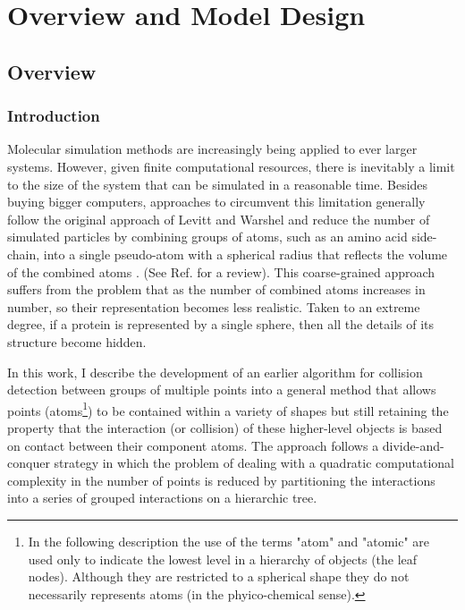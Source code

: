 \documentclass[review]{elsarticle}
\begin{document}
\clearpage
\section{Overview and Model Design}

\subsection{Overview}

\subsubsection{Introduction}

Molecular simulation methods are increasingly being applied to ever larger systems.
However, given finite computational resources, there is inevitably a limit to the size of
the system that can be simulated in a reasonable time.   Besides buying bigger computers, approaches to 
circumvent this limitation generally follow the original approach of Levitt and Warshel
\cite{LevittMet75}
and reduce the number of simulated particles by combining groups of atoms, such as an
amino acid side-chain, into a single pseudo-atom with a spherical radius that
reflects the volume of the combined atoms
\cite{BondPJet07,IzvekovSet05}.  (See Ref.\cite{TozziniV05} for a review).
This coarse-grained approach suffers from the problem that as the number of combined
atoms increases in number, so their representation becomes less realistic.  Taken
to an extreme degree, if a protein is represented by a single sphere, then all 
the details of its structure become hidden.  

In this work, I describe the development of an earlier algorithm for collision 
detection between groups of multiple points 
\cite{KatsimitsouliaZet10a,TaylorWRet10a}
into a general method that allows
points (atoms\footnote{
In the following description the use of the terms "atom" and "atomic" are used
only to indicate the lowest level in a hierarchy of objects (the leaf nodes).
Although they are restricted to a spherical shape they do not necessarily
represents atoms (in the phyico-chemical sense). 
}) to be contained within a variety of shapes but still retaining the 
property that the interaction (or collision) of these higher-level objects is based
on contact between their component atoms.
The approach follows a divide-and-conquer strategy in which the problem of
dealing with a quadratic computational complexity in the number of points
is reduced by partitioning the interactions into a series of grouped interactions
on a hierarchic tree.
\end{document}
